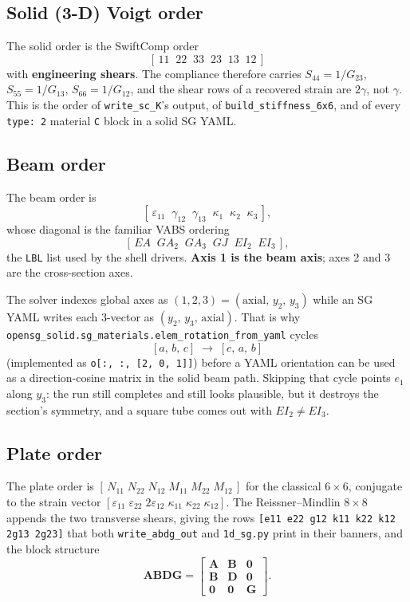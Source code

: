 \subsection{Solid (3-D) Voigt order}

The solid order is the SwiftComp order
\[
[\,11\;\;22\;\;33\;\;23\;\;13\;\;12\,]
\]
with \textbf{engineering shears}. The compliance therefore carries
$S_{44} = 1/G_{23}$, $S_{55} = 1/G_{13}$, $S_{66} = 1/G_{12}$, and the shear rows
of a recovered strain are $2\gamma$, not $\gamma$. This is the order of
\texttt{write\_sc\_K}'s output, of \texttt{build\_stiffness\_6x6}, and of every
\texttt{type: 2} material \texttt{C} block in a solid SG YAML.

\subsection{Beam order}

The beam order is
\[
[\,\varepsilon_{11}\;\;\gamma_{12}\;\;\gamma_{13}\;\;\kappa_1\;\;\kappa_2\;\;
\kappa_3\,],
\]
whose diagonal is the familiar VABS ordering
\[
[\,EA\;\;GA_2\;\;GA_3\;\;GJ\;\;EI_2\;\;EI_3\,],
\]
the \texttt{LBL} list used by the shell drivers. \textbf{Axis 1 is the beam
axis}; axes 2 and 3 are the cross-section axes.

The solver indexes global axes as $(1,2,3) = (\text{axial},\,y_2,\,y_3)$ while an
SG YAML writes each 3-vector as $(y_2,\,y_3,\,\text{axial})$. That is why
\texttt{opensg\_solid.sg\_materials.elem\_rotation\_from\_yaml} cycles
\[
[a,\,b,\,c] \;\longrightarrow\; [c,\,a,\,b]
\]
(implemented as \texttt{o[:, :, [2, 0, 1]]}) before a YAML orientation can be
used as a direction-cosine matrix in the solid beam path. Skipping that cycle
points $e_1$ along $y_3$: the run still completes and still looks plausible, but
it destroys the section's symmetry, and a square tube comes out with
$EI_2 \neq EI_3$.

\subsection{Plate order}

The plate order is $[\,N_{11}\;N_{22}\;N_{12}\;M_{11}\;M_{22}\;M_{12}\,]$ for the
classical $6\times6$, conjugate to the strain vector
$[\varepsilon_{11}\;\varepsilon_{22}\;2\varepsilon_{12}\;\kappa_{11}\;
\kappa_{22}\;\kappa_{12}]$. The Reissner--Mindlin $8\times8$ appends the two
transverse shears, giving the rows
\texttt{[e11 e22 g12 k11 k22 k12 2g13 2g23]} that both
\texttt{write\_abdg\_out} and \texttt{1d\_sg.py} print in their banners, and the
block structure
\[
\mathbf{ABDG} =
\begin{bmatrix}
\mathbf{A} & \mathbf{B} & \mathbf{0} \\
\mathbf{B} & \mathbf{D} & \mathbf{0} \\
\mathbf{0} & \mathbf{0} & \mathbf{G}
\end{bmatrix}.
\]

